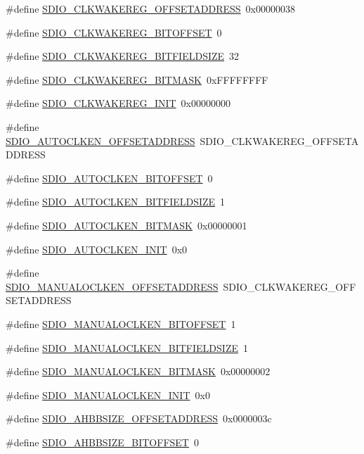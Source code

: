 \begin{DoxyCompactItemize}
\item 
\#define \hyperlink{a00571_a3ccb814d678149d6c060d61cb08e7166}{SDIO\_\-CLKWAKEREG\_\-OFFSETADDRESS}~0x00000038
\item 
\#define \hyperlink{a00571_a2ec6aa53bfc872d0014d46a1912632f7}{SDIO\_\-CLKWAKEREG\_\-BITOFFSET}~0
\item 
\#define \hyperlink{a00571_a34c9dd18379734c57268afe587231b76}{SDIO\_\-CLKWAKEREG\_\-BITFIELDSIZE}~32
\item 
\#define \hyperlink{a00571_a4b64b1f90905fe141064026bd5a292fb}{SDIO\_\-CLKWAKEREG\_\-BITMASK}~0xFFFFFFFF
\item 
\#define \hyperlink{a00571_ab0117a2586149842023dae096567aa2f}{SDIO\_\-CLKWAKEREG\_\-INIT}~0x00000000
\item 
\#define \hyperlink{a00571_a9713101baf9b8b08e627b23677d41e24}{SDIO\_\-AUTOCLKEN\_\-OFFSETADDRESS}~SDIO\_\-CLKWAKEREG\_\-OFFSETADDRESS
\item 
\#define \hyperlink{a00571_a9aef1c46516f7782db6bcd639156cbba}{SDIO\_\-AUTOCLKEN\_\-BITOFFSET}~0
\item 
\#define \hyperlink{a00571_ac606f0de76e14e03bfb2ba31bc183879}{SDIO\_\-AUTOCLKEN\_\-BITFIELDSIZE}~1
\item 
\#define \hyperlink{a00571_a31453275fbd3fcf04d80a27df5641f7c}{SDIO\_\-AUTOCLKEN\_\-BITMASK}~0x00000001
\item 
\#define \hyperlink{a00571_a9f4cbd964813ff7975386565ab17fcda}{SDIO\_\-AUTOCLKEN\_\-INIT}~0x0
\item 
\#define \hyperlink{a00571_a5379082277544a3bf9851a3b260d6923}{SDIO\_\-MANUALOCLKEN\_\-OFFSETADDRESS}~SDIO\_\-CLKWAKEREG\_\-OFFSETADDRESS
\item 
\#define \hyperlink{a00571_ac12c74d6292d9b4471297c0a758bd957}{SDIO\_\-MANUALOCLKEN\_\-BITOFFSET}~1
\item 
\#define \hyperlink{a00571_ad27e0ac58fd45037c3c7eda9ff8c92ef}{SDIO\_\-MANUALOCLKEN\_\-BITFIELDSIZE}~1
\item 
\#define \hyperlink{a00571_a1b1ec7f11bf8a76283a899e9cb9bd992}{SDIO\_\-MANUALOCLKEN\_\-BITMASK}~0x00000002
\item 
\#define \hyperlink{a00571_a0be3e89c7c25f8afed9739065e5aba72}{SDIO\_\-MANUALOCLKEN\_\-INIT}~0x0
\item 
\#define \hyperlink{a00571_a3598fc6613445cf2cc48b73a8e6ba726}{SDIO\_\-AHBBSIZE\_\-OFFSETADDRESS}~0x0000003c
\item 
\#define \hyperlink{a00571_a13de1df8fb8f81d3d86b2be44b698947}{SDIO\_\-AHBBSIZE\_\-BITOFFSET}~0
\item 

\end{DoxyCompactItemize}
